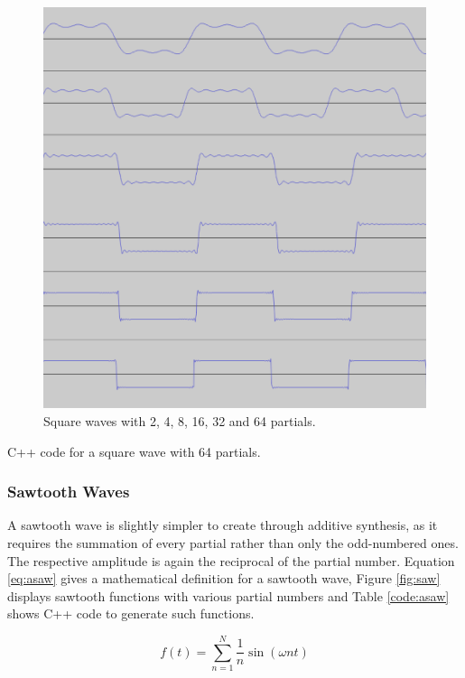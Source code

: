 \begin{figure}[p!]
  \includegraphics[scale=0.2]{img/square}
  \caption{Square waves with 2, 4, 8, 16, 32 and 64 partials.}
  \label{fig:square}
\end{figure}

\begin{table}[p!]
  \caption{C++ code for a square wave with 64 partials.}
  \label{code:asquare}
\end{table}

\pagebreak

\subsubsection{Sawtooth Waves}

A sawtooth wave is slightly simpler to create through additive synthesis, as it requires the summation of every partial rather than only the odd-numbered ones. The respective amplitude is again the reciprocal of the partial number. Equation \ref{eq:asaw} gives a mathematical definition for a sawtooth wave, Figure \ref{fig:saw} displays sawtooth functions with various partial numbers and Table \ref{code:asaw} shows C++ code to generate such functions.

\begin{equation}
  f(t) = \sum\limits_{n=1}^N \frac{1}{n} \sin(\omega n t)
  \label{eq:asaw}
\end{equation}

